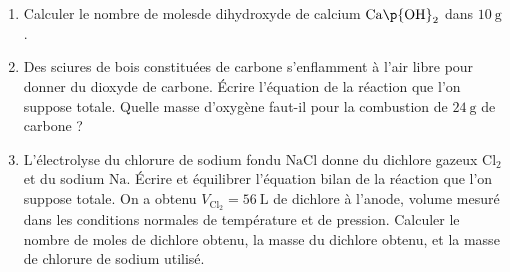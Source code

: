 \documentclass[a4paper,french,bookmarks]{article}
\begin{document}
\begin{enumerate}
        \item Calculer le nombre de molesde dihydroxyde de calcium $\text{Ca}\p{\text O \text H}_2$ dans $\qty{10}{\g}$.
        
        \noafter
        \nobefore\yesafter
        \yesbefore
        
        \item Des sciures de bois constituées de carbone s'enflamment à l'air libre pour donner du dioxyde de carbone. Écrire l'équation de la réaction que l'on suppose totale. Quelle masse d'oxygène faut-il pour la combustion de $\qty{24}{\g}$ de carbone ?
        
        \noafter
        \nobefore\yesafter
        \yesbefore
        
        \item L'électrolyse du chlorure de sodium fondu $\text{NaCl}$ donne du dichlore gazeux $\text{Cl}_2$ et du sodium $\text{Na}$. Écrire et équilibrer l'équation bilan de la réaction que l'on suppose totale. On a obtenu $V_{\text{Cl}_2} = \qty{56}{\L}$ de dichlore à l'anode, volume mesuré dans les conditions normales de température et de pression. Calculer le nombre de moles de dichlore obtenu, la masse du dichlore obtenu, et la masse de chlorure de sodium utilisé.
        
        \noafter
\end{enumerate}
\end{document}

